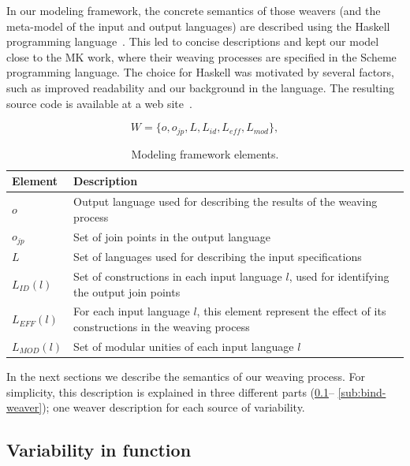 \documentclass{acm_proc_article-sp}
\begin{document}
In our modeling framework, the concrete semantics of those weavers (and the
meta-model of the input and output languages) are described using the Haskell
programming language~\cite{Jones:2002aa}. This led to concise descriptions and
kept our model close to the MK work, where their weaving processes are specified
in the Scheme programming language. The choice for Haskell was motivated by
several factors, such as improved readability and our background in the language.
The resulting source code is available at a web site~\cite{SPG:site}.

\begin{equation}
W = \{o, o_{jp}, L, L_{id}, L_{eff}, L_{mod}\},
\label{eq:tuple}
\end{equation}

\begin{table}[h]
\begin{center}
\caption{Modeling framework elements.} \label{tab:tup-01}
\begin{tabular}{|p{0.6in}|p{2.4in}|}
  \hline
  {\bf Element} & {\bf Description} \\
   \hline
  $o$              & Output language used for describing the results of the weaving process \\ \hline
  $o_{jp}$       & Set of join points in the output language \\ \hline
  $L$              & Set of languages used for describing the input specifications \\ \hline
  $L_{ID}(l)$      & Set of constructions in each input language $l$, used for identifying the output join points \\ \hline
  $L_{EFF}(l)$   & For each input language $l$, this element represent the effect of its constructions in the weaving process \\ \hline
  $L_{MOD}(l)$  & Set of modular unities of each input language $l$\\ \hline
  \hline
\end{tabular}
\end{center}
\end{table}

In the next sections we describe the semantics of
our weaving process. For simplicity, this description is explained in three
different parts (\ref{sub:pd-weaver}-- \ref{sub:bind-weaver}); one weaver
description for each source of variability. 

\subsection{Variability in function}\label{sub:pd-weaver}
\end{document}
